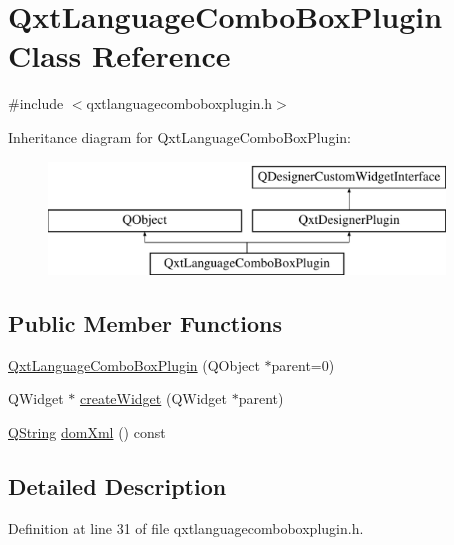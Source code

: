 \hypertarget{class_qxt_language_combo_box_plugin}{\section{Qxt\-Language\-Combo\-Box\-Plugin Class Reference}
\label{class_qxt_language_combo_box_plugin}
}


{\ttfamily \#include $<$qxtlanguagecomboboxplugin.\-h$>$}

Inheritance diagram for Qxt\-Language\-Combo\-Box\-Plugin\-:\begin{figure}[H]
\begin{center}
\leavevmode
\includegraphics[height=3.000000cm]{class_qxt_language_combo_box_plugin}
\end{center}
\end{figure}
\subsection*{Public Member Functions}
\begin{DoxyCompactItemize}
\item 
\hyperlink{class_qxt_language_combo_box_plugin_a8267f94bbd65839dea0c5e47a516131d}{Qxt\-Language\-Combo\-Box\-Plugin} (Q\-Object $\ast$parent=0)
\item 
Q\-Widget $\ast$ \hyperlink{class_qxt_language_combo_box_plugin_af027727bb8f4e1f0418c56639303f5bd}{create\-Widget} (Q\-Widget $\ast$parent)
\item 
\hyperlink{group___u_a_v_objects_plugin_gab9d252f49c333c94a72f97ce3105a32d}{Q\-String} \hyperlink{class_qxt_language_combo_box_plugin_a15e649d8bdc12471b0010df2b57214c9}{dom\-Xml} () const 
\end{DoxyCompactItemize}


\subsection{Detailed Description}


Definition at line 31 of file qxtlanguagecomboboxplugin.\-h.



